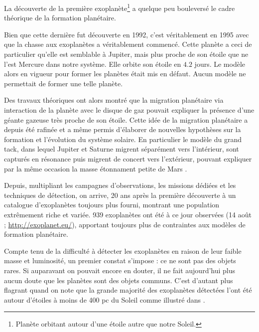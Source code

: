 La découverte de la première exoplanète\footnote{Planète orbitant autour d'une étoile autre que notre Soleil.} \citep{wolszczan1992planetary} a quelque peu bouleversé le cadre théorique de la formation planétaire.

Bien que cette dernière fut découverte en 1992, c'est véritablement en 1995 avec  \citep{mayor1995jupiter} que la chasse aux exoplanètes a véritablement commencé. Cette planète a ceci de particulier qu'elle est semblable à Jupiter, mais plus proche de son étoile que ne l'est Mercure dans notre système. Elle orbite son étoile en $4.2$ jours. Le modèle alors en vigueur pour former les planètes était mis en défaut. Aucun modèle ne permettait de former une telle planète. 

Des travaux théoriques ont alors montré que la migration planétaire via interaction de la planète avec le disque de gaz pouvait expliquer la présence d'une géante gazeuse très proche de son étoile. Cette idée de la migration planétaire a depuis été rafinée et a même permis d'élaborer de nouvelles hypothèses sur la formation et l'évolution du système solaire. En particulier le modèle du grand tack\citep{morbidelli2007dynamics, pierens2011twophase}, dans lequel Jupiter et Saturne migrent séparément vers l'intérieur, sont capturés en résonance puis migrent de concert vers l'extérieur, pouvant expliquer par la même occasion la masse étonnament petite de Mars \citep{walsh2011low}. 

Depuis, multipliant les campagnes d'observations, les missions dédiées et les techniques de détection, on arrive, 20 ans après la première découverte à un catalogue d'exoplanètes toujours plus fourni, montrant une population extrêmement riche et variée. 939 exoplanètes ont été à ce jour observées (14 août ; \url{http://exoplanet.eu/}), apportant toujours plus de contraintes aux modèles de formation planétaire. 

Compte tenu de la difficulté à détecter les exoplanètes en raison de leur faible masse et luminosité, un premier constat s'impose : ce ne sont pas des objets rares. Si auparavant on pouvait encore en douter, il ne fait aujourd'hui plus aucun doute que les planètes sont des objets communs. C'est d'autant plus flagrant quand on note que la grande majorité des exoplanètes détectées l'ont été autour d'étoiles à moins de 400 pc du Soleil comme illustré dans . 

